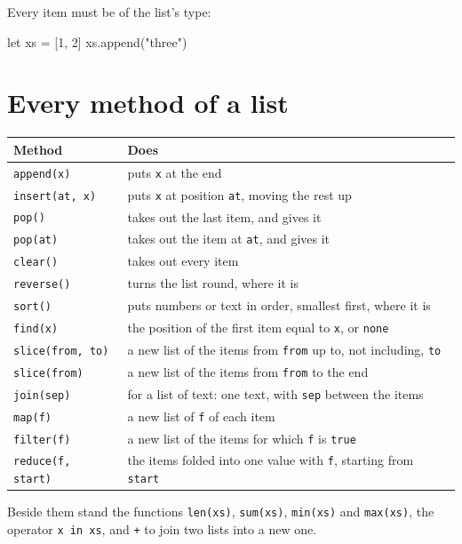 Every item must be of the list's type:

\begin{zeno}[fails=yes]
let xs = [1, 2]
xs.append("three")
\end{zeno}

\section{Every method of a list}

\begin{center}
\begin{tabular}{lP{8.6cm}}
\toprule
Method & Does \\
\midrule
\verb|append(x)| & puts \verb|x| at the end \\
\verb|insert(at, x)| & puts \verb|x| at position \verb|at|, moving the rest up \\
\verb|pop()| & takes out the last item, and gives it \\
\verb|pop(at)| & takes out the item at \verb|at|, and gives it \\
\verb|clear()| & takes out every item \\
\verb|reverse()| & turns the list round, where it is \\
\verb|sort()| & puts numbers or text in order, smallest first, where it is \\
\verb|find(x)| & the position of the first item equal to \verb|x|, or \verb|none| \\
\verb|slice(from, to)| & a new list of the items from \verb|from| up to, not including, \verb|to| \\
\verb|slice(from)| & a new list of the items from \verb|from| to the end \\
\verb|join(sep)| & for a list of text: one text, with \verb|sep| between the items \\
\verb|map(f)| & a new list of \verb|f| of each item \\
\verb|filter(f)| & a new list of the items for which \verb|f| is \verb|true| \\
\verb|reduce(f, start)| & the items folded into one value with \verb|f|, starting from \verb|start| \\
\bottomrule
\end{tabular}
\end{center}

Beside them stand the functions \verb|len(xs)|, \verb|sum(xs)|,
\verb|min(xs)| and \verb|max(xs)|, the operator \verb|x in xs|, and
\verb|+| to join two lists into a new one.

